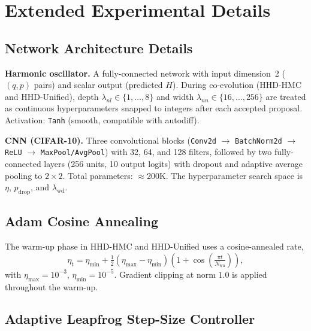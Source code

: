 \documentclass[11pt]{article}
\theoremstyle{definition}
\begin{document}

\section{Extended Experimental Details}
\label{app:experimental}

\subsection{Network Architecture Details}

\textbf{Harmonic oscillator.}
A fully-connected network with input dimension~2 ($(q,p)$ pairs)
and scalar output (predicted $H$). During co-evolution (HHD-HMC and HHD-Unified), depth $\lambda_{nl} \in \{1,\ldots,8\}$ and width
$\lambda_{nn} \in \{16,\ldots,256\}$ are treated as continuous
hyperparameters snapped to integers after each accepted proposal.
Activation: \texttt{Tanh} (smooth, compatible with autodiff).

\textbf{CNN (CIFAR-10).}
Three convolutional blocks (\texttt{Conv2d} $\to$ \texttt{BatchNorm2d}
$\to$ \texttt{ReLU} $\to$ \texttt{MaxPool/AvgPool}) with 32, 64, and
128 filters, followed by two fully-connected layers (256 units, 10
output logits) with dropout and adaptive average pooling to $2\times2$.
Total parameters: $\approx$200K. The hyperparameter search space is
$\eta$, $p_{\mathrm{drop}}$, and $\lambda_{\mathrm{wd}}$.

\subsection{Adam Cosine Annealing}

The warm-up phase in HHD-HMC and HHD-Unified uses a cosine-annealed rate,
\begin{equation}
\eta_t = \eta_{\min}
  + \tfrac{1}{2}(\eta_{\max}-\eta_{\min})
    \!\left(1+\cos\!\left(\tfrac{\pi t}{N_{\mathrm{wu}}}\right)\right),
\label{eq:cosine}
\end{equation}
with $\eta_{\max}=10^{-3}$, $\eta_{\min}=10^{-5}$.
Gradient clipping at norm $1.0$ is applied throughout the warm-up.

\subsection{Adaptive Leapfrog Step-Size Controller}
\end{document}
